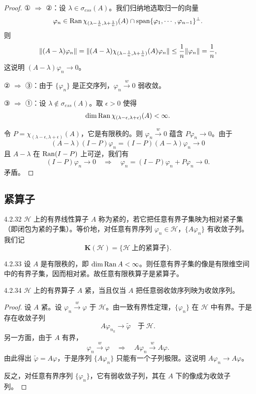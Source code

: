 \begin{proof}
  ① $\Longrightarrow$ ②：设 $\lambda\in\sigma_{ess}(A)$。我们归纳地选取归一的向量
  \[
  \varphi_n\in\operatorname{Ran}\chi_{(\lambda-\frac1n,\lambda+\frac1n)}(A)\cap\operatorname{span}\{\varphi_1,\cdots,\varphi_{n-1}\}^{\perp}.
  \]
  则
  \[
  \lVert (A-\lambda)\varphi_n\rVert
  =\lVert (A-\lambda)\chi_{(\lambda-\frac1n,\lambda+\frac1n)}(A)\varphi_n\rVert
  \le\frac1n\lVert \varphi_n\rVert=\frac1n,
  \]
  这说明 $(A-\lambda)\varphi_n\to0$。

  ② $\Longrightarrow$ ③：由于 $\{\varphi_n\}$ 是正交序列，$\varphi_n\xrightarrow{w}0$ 弱收敛。

  ③ $\Longrightarrow$ ①：设 $\lambda\notin\sigma_{ess}(A)$。取 $\epsilon>0$ 使得
  \[
  \dim\operatorname{Ran}\chi_{(\lambda-\epsilon,\lambda+\epsilon)}(A)<\infty.
  \]

  令 $P=\chi_{(\lambda-\epsilon,\lambda+\epsilon)}(A)$，它是有限秩的。则 $\varphi_n\xrightarrow{w}0$ 蕴含 $P\varphi_n\to0$。由于
  \[
  (A-\lambda)(I-P)\varphi_n=(I-P)(A-\lambda)\varphi_n\to0
  \]
  且 $A-\lambda$ 在 $\operatorname{Ran}(I-P)$ 上可逆，我们有
  \[
  (I-P)\varphi_n\to0
  \quad\Longrightarrow\quad
  \varphi_n=(I-P)\varphi_n+P\varphi_n\to0.
  \]
  矛盾。
\end{proof}

\subsection{紧算子}

\begin{definition}{4.2.32}
  $\mathcal{H}$ 上的有界线性算子 $A$ 称为紧的，若它把任意有界子集映为相对紧子集（即闭包为紧的子集）。等价地，对任意有界序列 $\varphi_n\in\mathcal{H}$，$\{A\varphi_n\}$ 有收敛子列。我们记
  \[
  \mathbf{K}(\mathcal{H})=\{\mathcal{H}\ \text{上的紧算子}\}.
  \]
\end{definition}

\begin{example}{4.2.33}
  设 $A$ 是有限秩的，即 $\dim\operatorname{Ran} A<\infty$。则任意有界子集的像是有限维空间中的有界子集，因而相对紧。故任意有限秩算子是紧算子。
\end{example}

\begin{proposition}{4.2.34}
  $\mathcal{H}$ 上的有界算子 $A$ 紧，当且仅当 $A$ 把任意弱收敛序列映为收敛序列。
\end{proposition}

\begin{proof}
  设 $A$ 紧。设 $\varphi_n\xrightarrow{w}\varphi$ 于 $\mathcal{H}$。由一致有界性定理，$\{\varphi_n\}$ 在 $\mathcal{H}$ 中有界。于是存在收敛子列
  \[
  A\varphi_{n_k}\to\tilde\varphi\quad\text{于}\ \mathcal{H}.
  \]
  另一方面，由于 $A$ 有界，
  \[
  \varphi_n\xrightarrow{w}\varphi
  \quad\Longrightarrow\quad
  A\varphi_n\xrightarrow{w}A\varphi.
  \]
  由此得出 $\tilde\varphi=A\varphi$，于是序列 $\{A\varphi_n\}$ 只能有一个子列极限。这说明 $A\varphi_n\to A\varphi$。

  反之，对任意有界序列 $\{\varphi_n\}$，它有弱收敛子列，其在 $A$ 下的像成为收敛子列。
\end{proof}

